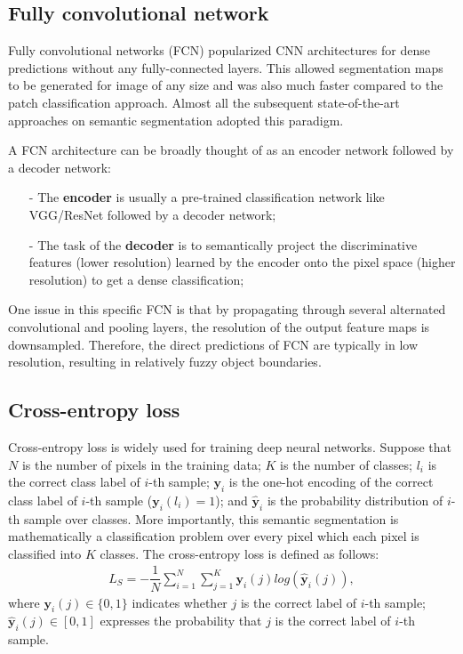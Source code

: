 \documentclass[conference]{IEEEtran}
\begin{document}
\subsection{Fully convolutional network}
Fully convolutional networks (FCN) popularized CNN architectures for dense
predictions without any fully-connected layers. This allowed segmentation maps
to be generated for image of any size and was also much faster compared to the
patch classification approach. Almost all the subsequent state-of-the-art
approaches on semantic segmentation adopted this paradigm.

A FCN architecture can be broadly thought of as an encoder network followed by
a decoder network:
\begin{itemize}
\item[-] The \textbf{encoder} is usually a pre-trained classification network
like VGG/ResNet followed by a decoder network;
\item[-] The task of the \textbf{decoder} is to semantically project the
discriminative features (lower resolution) learned by the encoder onto the pixel
space (higher resolution) to get a dense classification;
\end{itemize}

One issue in this specific FCN is that by propagating through several alternated
convolutional and pooling layers, the resolution of the output feature maps is
downsampled. Therefore, the direct predictions of FCN are typically in low
resolution, resulting in relatively fuzzy object boundaries.

\subsection{Cross-entropy loss}
Cross-entropy loss is widely used for training deep neural networks. Suppose
that $N$ is the number of pixels in the training data; $K$ is the number of
classes; $l_i$ is the correct class label of $i$-th sample; $\textbf{y}_i$ is
the one-hot encoding of the correct class label of $i$-th sample
($\textbf{y}_i(l_i) = 1$); and $\widehat{\textbf{y}}_i$ is the probability
distribution of $i$-th sample over classes. More importantly,
this semantic segmentation is mathematically a classification problem over
every pixel which each pixel is classified into $K$ classes. The
cross-entropy loss is defined as follows:
\begin{align}
L_S = -\dfrac{1}{N}\sum_{i=1}^{N}\sum_{j=1}^K\textbf{y}_i(j)
	log(\widehat{\textbf{y}}_i(j)),
\label{crossentropyal}
\end{align}
where $\textbf{y}_i(j) \in \{0,1\} $ indicates whether $j$ is the correct label
of $i$-th sample; $\widehat{\textbf{y}}_i(j) \in [0,1] $ expresses the
probability that $j$ is the correct label of $i$-th sample.
\end{document}
